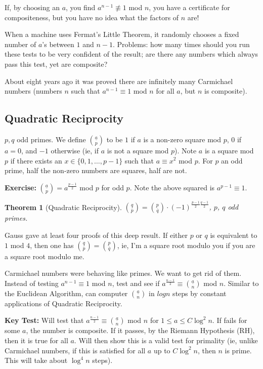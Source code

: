 \documentclass[12pt,letterpaper]{report}
\newcommand{\jsq}[1]{ { \underline{#1} \choose q} }            %
\newcommand{\jsn}[1]{ { \underline{#1} \choose n} }            %
\newcommand{\js}[1]{ { \underline{#1} \choose p} }
\newtheorem{thm}{Theorem}[section]
\begin{document}
If, by choosing an $a$, you find $a^{n-1} \not\equiv 1$ mod $n$,
you have a certificate for compositeness, but you have no idea
what the factors of $n$ are!

When a machine uses Fermat's Little Theorem, it randomly chooses a
fixed number of $a$'s between $1$ and $n-1$. Problems: how many
times should you run these tests to be very confident of the
result; are there any numbers which always pass this test, yet are
composite?

About eight years ago it was proved there are infinitely many
Carmichael numbers (numbers $n$ such that $a^{n-1} \equiv 1$ mod
$n$ for all $a$, but $n$ is composite).

\subsection{Quadratic Reciprocity}

$p, q$ odd primes. We define $\js{a}$ to be $1$ if $a$ is a
non-zero square mod $p$, $0$ if $a = 0$, and $-1$ otherwise (ie,
if $a$ is not a square mod $p$). Note $a$ is a square mod $p$ if
there exists an $x \in \{0,1, \dots, p-1\}$ such that $a \equiv
x^2$ mod $p$. For $p$ an odd prime, half the non-zero numbers are
squares, half are not.

\textbf{Exercise:} $\js{a} = a^{\frac{p-1}{2}}$ mod $p$ for odd
$p$. Note the above squared is $a^{p-1} \equiv 1$.

\begin{thm}[Quadratic Reciprocity]$\js{q} = \jsq{p} \cdot (-1)^{\frac{p-1}{2}
\frac{q-1}{2}}$, $p$, $q$ odd primes.
\end{thm}

Gauss gave at least four proofs of this deep result. If either $p$
or $q$ is equivalent to $1$ mod $4$, then one has $\js{q} =
\jsq{p}$, ie, I'm a square root modulo you if you are a square
root modulo me.

Carmichael numbers were behaving like primes. We want to get rid
of them. Instead of testing $a^{n-1} \equiv 1$ mod $n$, test and
see if $a^{\frac{n-1}{2}} \equiv \jsn{a}$ mod $n$. Similar to the
Euclidean Algorithm, can computer $\jsn{a}$ in $log n$ steps by
constant applications of Quadratic Reciprocity.

\textbf{Key Test:} Will test that $a^{\frac{n-1}{2}} \equiv
\jsn{a}$ mod $n$ for $1 \le a \le C \log^2 n$. If fails for some
$a$, the number is composite. If it passes, by the Riemann
Hypothesis (RH), then it is true for all $a$. Will then show this
is a valid test for primality (ie, unlike Carmichael numbers, if
this is satisfied for all $a$ up to $C \log^2 n$, then $n$ is
prime. This will take about $\log^4 n$ steps).
\end{document}
